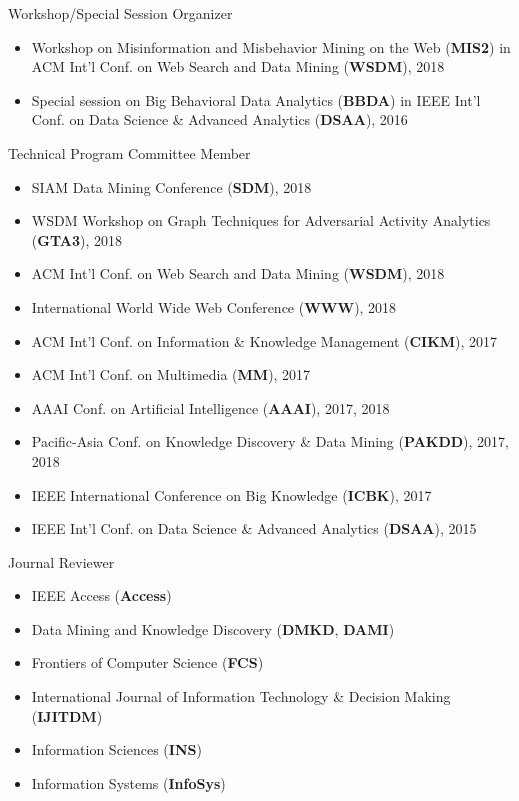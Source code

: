 \documentclass[margin, 9pt]{res}
\begin{document}
\begin{resume}
{Workshop/Special Session Organizer}
\begin{itemize}
\item Workshop on Misinformation and Misbehavior Mining on the Web (\textbf{MIS2})
	in ACM Int'l Conf. on Web Search and Data Mining (\textbf{WSDM}), 2018
\item Special session on Big Behavioral Data Analytics (\textbf{BBDA})
	in IEEE Int'l Conf. on Data Science \& Advanced Analytics (\textbf{DSAA}), 2016
\end{itemize}
\vspace{-0.1in}
{Technical Program Committee Member}
\begin{itemize}
\item SIAM Data Mining Conference (\textbf{SDM}), 2018
\item WSDM Workshop on Graph Techniques for Adversarial Activity Analytics (\textbf{GTA3}), 2018
\item ACM Int'l Conf. on Web Search and Data Mining (\textbf{WSDM}), 2018
\item International World Wide Web Conference (\textbf{WWW}), 2018
\item ACM Int'l Conf. on Information \& Knowledge Management (\textbf{CIKM}), 2017
\item ACM Int'l Conf. on Multimedia (\textbf{MM}), 2017
\item AAAI Conf. on Artificial Intelligence (\textbf{AAAI}), 2017, 2018
\item Pacific-Asia Conf. on Knowledge Discovery \& Data Mining (\textbf{PAKDD}), 2017, 2018
\item IEEE International Conference on Big Knowledge (\textbf{ICBK}), 2017
\item IEEE Int'l Conf. on Data Science \& Advanced Analytics (\textbf{DSAA}), 2015
\end{itemize}
\vspace{-0.1in}
{Journal Reviewer}
\begin{itemize}
\item IEEE Access (\textbf{Access})
\item Data Mining and Knowledge Discovery (\textbf{DMKD}, \textbf{DAMI})
\item Frontiers of Computer Science (\textbf{FCS})
\item International Journal of Information Technology \& Decision Making (\textbf{IJITDM})
\item Information Sciences (\textbf{INS})
\item Information Systems (\textbf{InfoSys})

\end{itemize}
\end{resume}
\end{document}
